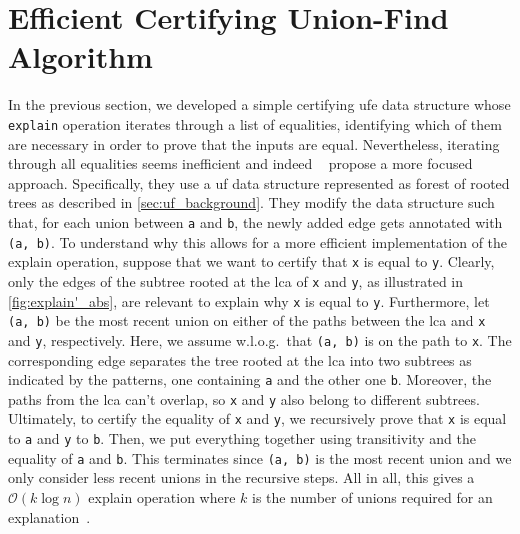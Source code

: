\documentclass[
  sigplan,
  10pt,
  anonymous,
  review,
  ]{acmart}
\begin{document}
\section{Efficient Certifying Union-Find Algorithm}
In the previous section, we developed a simple certifying \acrfull{ufe} data structure whose \lstinline|explain| operation iterates through a list of equalities,
identifying which of them are necessary in order to prove that the inputs are equal.
Nevertheless, iterating through all equalities seems inefficient and indeed \citeauthor{congcl_proofs}~\cite{congcl_proofs} propose a more focused approach.
Specifically, they use a \acrshort{uf} data structure represented as forest of rooted trees as described in \autoref{sec:uf_background}.
They modify the data structure such that, for each union between \lstinline|a| and \lstinline|b|, the newly added edge gets annotated with \lstinline|(a, b)|.
To understand why this allows for a more efficient implementation of the explain operation, suppose that we want to certify that \lstinline|x| is equal to \lstinline|y|.
Clearly, only the edges of the subtree rooted at the \acrfull{lca} of \lstinline|x| and \lstinline|y|, as illustrated in \autoref{fig:explain'_abs}, are relevant to explain why \lstinline|x| is equal to \lstinline|y|.
Furthermore, let \lstinline|(a, b)| be the most recent union on either of the paths between the \acrshort{lca} and \lstinline|x| and \lstinline|y|, respectively.
Here, we assume w.l.o.g.\ that \lstinline|(a, b)| is on the path to \lstinline|x|.
The corresponding edge separates the tree rooted at the \acrshort{lca} into two subtrees as indicated by the patterns,  one containing \lstinline|a| and the other one \lstinline|b|.
Moreover, the paths from the \acrshort{lca} can't overlap, so \lstinline|x| and \lstinline|y| also belong to different subtrees.
Ultimately, to certify the equality of \lstinline|x| and \lstinline|y|, we recursively prove that \lstinline|x| is equal to \lstinline|a| and \lstinline|y| to \lstinline|b|.
Then, we put everything together using transitivity and the equality of \lstinline|a| and \lstinline|b|.
This terminates since \lstinline|(a, b)| is the most recent union and we only consider less recent unions in the recursive steps.
All in all, this gives a $\mathcal{O}(k \log n)$ explain operation where $k$ is the number of unions required for an explanation~\cite{congcl_proofs}.
\end{document}
